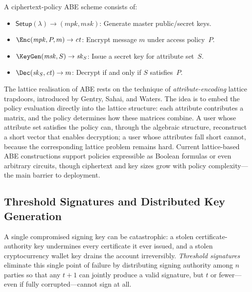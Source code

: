\begin{definition}
\label{def:cp-abe}
A ciphertext-policy ABE scheme consists of:
\begin{itemize}
\item $\mathsf{Setup}(\lambda) \to (\mathit{mpk}, \mathit{msk})$: Generate master public/secret keys.
\item $\Enc(\mathit{mpk}, P, m) \to \mathit{ct}$: Encrypt message $m$ under access policy~$P$.
\item $\KeyGen(\mathit{msk}, S) \to \mathit{sk}_S$: Issue a secret key for attribute set~$S$.
\item $\Dec(\mathit{sk}_S, \mathit{ct}) \to m$: Decrypt if and only if $S$ satisfies~$P$.
\end{itemize}
\end{definition}

The lattice realisation of ABE rests on the technique of \emph{attribute-encoding} lattice trapdoors, introduced by Gentry, Sahai, and Waters.  The idea is to embed the policy evaluation directly into the lattice structure: each attribute contributes a matrix, and the policy determines how these matrices combine.  A user whose attribute set satisfies the policy can, through the algebraic structure, reconstruct a short vector that enables decryption; a user whose attributes fall short cannot, because the corresponding lattice problem remains hard.  Current lattice-based ABE constructions support policies expressible as Boolean formulas or even arbitrary circuits, though ciphertext and key sizes grow with policy complexity---the main barrier to deployment.


\subsection{Threshold Signatures and Distributed Key Generation}
\label{subsec:threshold}

A single compromised signing key can be catastrophic: a stolen certificate-authority key undermines every certificate it ever issued, and a stolen cryptocurrency wallet key drains the account irreversibly.  \emph{Threshold signatures} eliminate this single point of failure by distributing signing authority among $n$ parties so that any $t+1$ can jointly produce a valid signature, but $t$ or fewer---even if fully corrupted---cannot sign at all.

